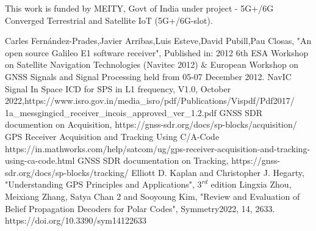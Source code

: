 \documentclass[conference]{IEEEtran}
\begin{document}
This work is funded by MEITY, Govt of India under project - 5G+/6G Converged Terrestrial and Satellite IoT (5G+/6G-slot).

\begin{thebibliography}{00}
 Carles Fernández-Prades,Javier Arribas,Luis Esteve,David Pubill,Pau Closas, "An open source Galileo E1 software receiver", Published in: 2012 6th ESA Workshop on Satellite Navigation Technologies (Navitec 2012) $\&$ European Workshop on GNSS Signals and Signal Processing held from 05-07 December 2012.
 NavIC Signal In Space ICD for SPS in L1 frequency, V1.0, October 2022,https://www.isro.gov.in/media\_isro/pdf/Publications/Vispdf/Pdf2017/\\1a\_messgingicd\_receiver\_incois\_approved\_ver\_1.2.pdf
 GNSS SDR documention on Acquisition, https://gnss-sdr.org/docs/sp-blocks/acquisition/
 GPS Receiver Acquisition and Tracking Using C/A-Code https://in.mathworks.com/help/satcom/ug/gps-receiver-acquisition-and-tracking-using-ca-code.html
 GNSS SDR documentation on Tracking, https://gnss-sdr.org/docs/sp-blocks/tracking/
 Elliott D. Kaplan and Christopher J. Hegarty,  "Understanding {GPS} {P}rinciples and {A}pplications", $3^{rd}$ edition
 Lingxia Zhou, Meixiang Zhang, Satya Chan 2 and Sooyoung Kim, "Review and Evaluation of Belief Propagation Decoders for Polar Codes", Symmetry2022, 14, 2633. https://doi.org/10.3390/sym14122633
\end{thebibliography}
\vspace{12pt}
\end{document}
